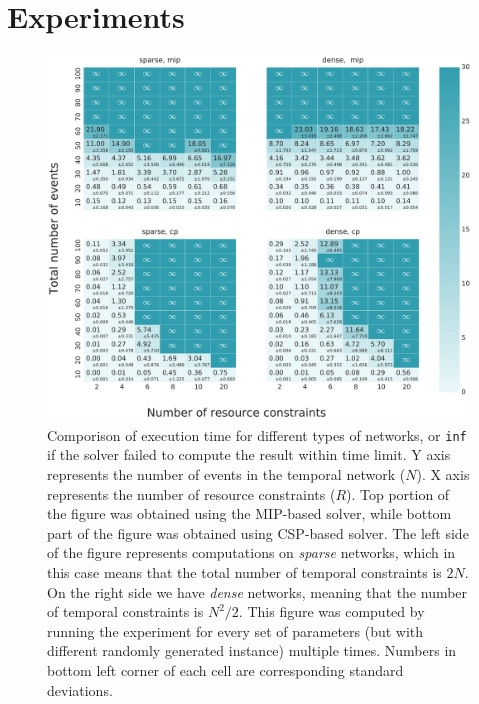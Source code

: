 \section{Experiments}

\begin{figure}
\begin{center}
\includegraphics[width=\textwidth]{execution_time_std}
\caption{Comporison of execution time for different types of networks, or \texttt{inf} if the solver failed to compute the result within time limit. Y axis represents the number of events in the temporal network ($N$). X axis represents the number of resource constraints ($R$). Top portion of the figure was obtained using the MIP-based solver, while bottom part of the figure was obtained using CSP-based solver. The left side of the figure represents computations on \textit{sparse} networks, which in this case means that the total number of temporal constraints is $2N$. On the right side we have \textit{dense} networks, meaning that the number of temporal constraints is $N^2/2$. This figure was computed by running the experiment for every set of parameters (but with different randomly generated instance) multiple times. Numbers in bottom left corner of each cell are corresponding standard deviations.}
\label{fig:execution_time}
\end{center}
\end{figure}

